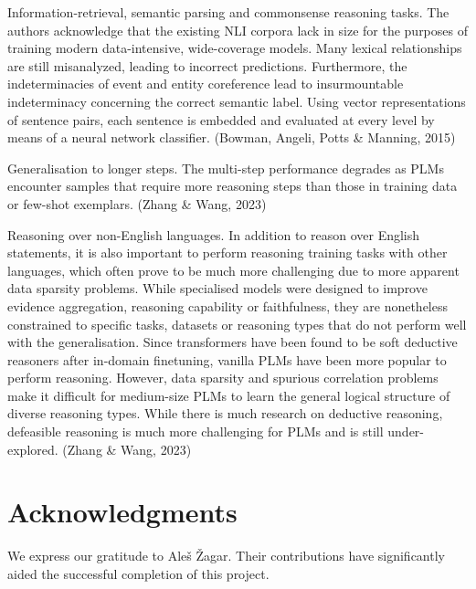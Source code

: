 \documentclass[fleqn,moreauthors,10pt]{ds_report}
\begin{document}
Information-retrieval, semantic parsing and commonsense reasoning tasks. The authors acknowledge that the existing NLI corpora lack in size for the purposes of training modern data-intensive, wide-coverage models. Many lexical relationships are still misanalyzed, leading to incorrect predictions. Furthermore, the indeterminacies of event and entity coreference lead to insurmountable indeterminacy concerning the correct semantic label. Using vector representations of sentence pairs, each sentence is embedded and evaluated at every level by means of a neural network classifier. (Bowman, Angeli, Potts \& Manning, 2015)

Generalisation to longer steps. The multi-step performance degrades as PLMs encounter samples that require more reasoning steps than those in training data or few-shot exemplars. (Zhang \& Wang, 2023)

Reasoning over non-English languages. In addition to reason over English statements, it is also important to perform reasoning training tasks with other languages, which often prove to be much more challenging due to more apparent data sparsity problems. While specialised models were designed to improve evidence aggregation, reasoning capability or faithfulness, they are nonetheless constrained to specific tasks, datasets or reasoning types that do not perform well with  the generalisation. Since transformers have been found to be soft deductive reasoners after in-domain finetuning, vanilla PLMs have been more popular to perform reasoning. However, data sparsity and spurious correlation problems make it difficult for medium-size PLMs to learn the general logical structure of diverse reasoning types. While there is much research on deductive reasoning, defeasible reasoning is much more challenging for PLMs and is still under-explored. (Zhang \& Wang, 2023)


\section*{Acknowledgments}

We express our gratitude to Aleš Žagar. Their contributions have significantly aided the successful completion of this project.



\end{document}
